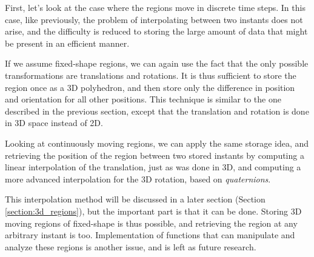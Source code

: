 First, let's look at the case where the regions move in discrete time steps. In this case, like previously, the problem of interpolating between two instants does not arise, and the difficulty is reduced to storing the large amount of data that might be present in an efficient manner. 

If we assume fixed-shape regions, we can again use the fact that the only possible transformations are translations and rotations. It is thus sufficient to store the region once as a 3D polyhedron, and then store only the difference in position and orientation for all other positions. This technique is similar to the one described in the previous section, except that the translation and rotation is done in 3D space instead of 2D.

Looking at continuously moving regions, we can apply the same storage idea, and retrieving the position of the region between two stored instants by computing a linear interpolation of the translation, just as was done in 3D, and computing a more advanced interpolation for the 3D rotation, based on \textit{quaternions}.

This interpolation method will be discussed in a later section (Section \ref{section:3d_regions}), but the important part is that it can be done. Storing 3D moving regions of fixed-shape is thus possible, and retrieving the region at any arbitrary instant is too. Implementation of functions that can manipulate and analyze these regions is another issue, and is left as future research.